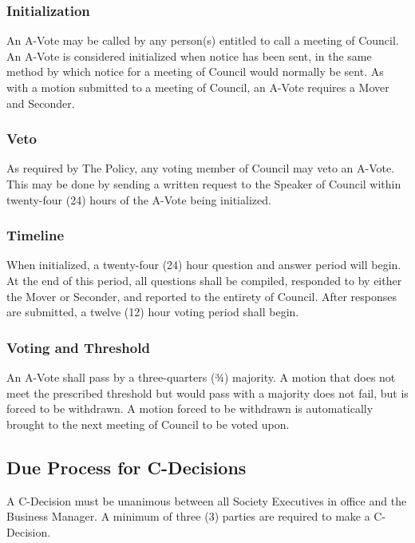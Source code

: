 \subsubsection{Initialization}
An A-Vote may be called by any person(s) entitled to call a meeting of Council.  An A-Vote is considered 
initialized when notice has been sent, in the same method by which notice for a meeting of Council would 
normally be sent. As with a motion submitted to a meeting of Council, an A-Vote requires a Mover and 
Seconder.

\subsubsection{Veto}
As required by The Policy, any voting member of Council may veto an A-Vote.  This may be done by 
sending a written request to the Speaker of Council within twenty-four (24) hours of the A-Vote being 
initialized.

\subsubsection{Timeline}
When initialized, a twenty-four (24) hour question and answer period will begin.  At the end of this 
period, all questions shall be compiled, responded to by either the Mover or Seconder, and reported to the entirety of Council. After responses are submitted, a twelve (12) hour voting period shall begin.

\subsubsection{Voting and Threshold}
An A-Vote shall pass by a three-quarters (¾) majority.  A motion that does not meet the prescribed 
threshold but would pass with a majority does not fail, but is forced to be withdrawn.  A motion 
forced to be withdrawn is automatically brought to the next meeting of Council to be voted upon.

\subsection{Due Process for C-Decisions}
A C-Decision must be unanimous between all Society Executives in office and the Business Manager.  A 
minimum of three (3) parties are required to make a C-Decision.
